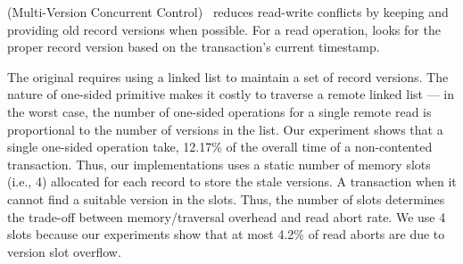 \mvcc (Multi-Version Concurrent Control)~\cite{bernstein1983multiversion} 
reduces read-write conflicts 
by keeping and providing old record versions when possible. 
For a read operation, \mvcc 
looks for the proper record version 
based on the transaction's current timestamp.

The original \mvcc requires using a linked list to 
maintain a set of record versions. 
The nature of one-sided primitive makes it 
costly to traverse a remote linked list --- in the worst case,
the number of one-sided operations for a single remote
read is proportional to the number of versions
in the list.
Our experiment shows that 
a single one-sided operation take, 
12.17\% of the overall time of a non-contented transaction.
Thus, our \mvcc implementations uses a static number of memory slots (i.e., 4) allocated for each record to store the stale versions.
A transaction when it cannot find a suitable version in the slots.
Thus, the number of slots determines the trade-off between 
memory/traversal overhead and read abort rate. 
We use 4 slots because 
our experiments show that
at most 4.2\% of read aborts are 
due to version slot overflow.

